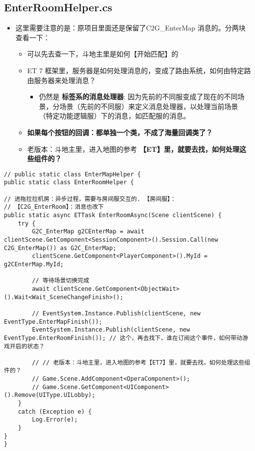 \documentclass[9pt, b5paper]{article}
\begin{document}
\subsection{EnterRoomHelper.cs}
\label{sec:org9b291f9}
\begin{itemize}
\item 这里需要注意的是：原项目里面还是保留了C2G\_EnterMap 消息的。分两块查看一下：
\begin{itemize}
\item 可以先去查一下，斗地主里是如何【开始匹配】的
\item ET 7 框架里，服务器是如何处理消息的，变成了路由系统，如何由特定路由服务器来处理消息？
\begin{itemize}
\item 仍然是 \textbf{标签系的消息处理器}: 因为先前的不同服变成了现在的不同场景，分场景（先前的不同服）来定义消息处理器，以处理当前场景（特定功能逻辑服）下的消息，如匹配服的消息。
\end{itemize}
\item \textbf{如果每个按钮的回调：都单独一个类，不成了海量回调类了？}
\item 老版本：斗地主里，进入地图的参考 \textbf{【ET】里，就要去找，如何处理这些组件的？}
\end{itemize}
\end{itemize}
\begin{verbatim}
// public static class EnterMapHelper {
public static class EnterRoomHelper {

// 进拖拉拉机房：异步过程，需要与房间服交互的. 【房间服】：
// 【C2G_EnterRoom】：消息也改下
public static async ETTask EnterRoomAsync(Scene clientScene) {
    try {
        G2C_EnterMap g2CEnterMap = await clientScene.GetComponent<SessionComponent>().Session.Call(new C2G_EnterMap()) as G2C_EnterMap;
        clientScene.GetComponent<PlayerComponent>().MyId = g2CEnterMap.MyId;

        // 等待场景切换完成
        await clientScene.GetComponent<ObjectWait>().Wait<Wait_SceneChangeFinish>();

        // EventSystem.Instance.Publish(clientScene, new EventType.EnterMapFinish());
        EventSystem.Instance.Publish(clientScene, new EventType.EnterRoomFinish()); // 这个，再去找下，谁在订阅这个事件，如何带动游戏开启的状态？

        // // 老版本：斗地主里，进入地图的参考【ET7】里，就要去找，如何处理这些组件的？
        // Game.Scene.AddComponent<OperaComponent>();
        // Game.Scene.GetComponent<UIComponent>().Remove(UIType.UILobby);
    }
    catch (Exception e) {
        Log.Error(e);
    }    
}
}
\end{verbatim}
\end{document}
